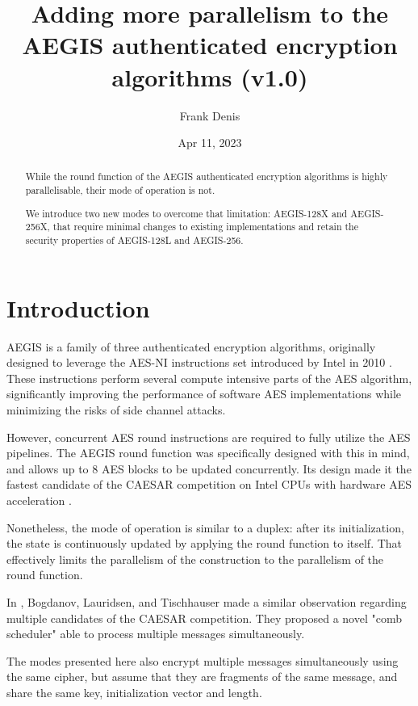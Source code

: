 \documentclass[envcountsame,runningheads,notitlepage]{llncs}
\title{Adding more parallelism to the AEGIS authenticated encryption algorithms (v1.0)}
\date{Apr 11, 2023}
\author{
  Frank Denis\inst{}
}
\institute{Fastly Inc.\\
  \href{mailto:fde@00f.net}{fde@00f.net}
}
\author{}
\institute{}
\begin{document}
\maketitle

\markboth{}{}

\begin{abstract}
  While the round function of the AEGIS authenticated encryption algorithms is highly parallelisable, their mode of operation is not.

  We introduce two new modes to overcome that limitation: AEGIS-128X and AEGIS-256X, that require minimal changes to existing implementations and retain the security properties of AEGIS-128L and AEGIS-256.
\end{abstract}

\section{Introduction}
\label{sec:introduction}

AEGIS \cite{SAC:WuPre13} is a family of three authenticated encryption algorithms, originally designed to leverage the AES-NI instructions set introduced by Intel in 2010 \cite{Akdemir2010BreakthroughAP}.
These instructions perform several compute intensive parts of the AES algorithm, significantly improving the performance of software AES implementations while minimizing the risks of side channel attacks.

However, concurrent AES round instructions are required to fully utilize the AES pipelines. The AEGIS round function was specifically designed with this in mind, and allows up to 8 AES blocks to be updated concurrently. Its design made it the fastest candidate of the CAESAR competition on Intel CPUs with hardware AES acceleration \cite{EPRINT:ARAR16}.

Nonetheless, the mode of operation is similar to a duplex: after its initialization, the state is continuously updated by applying the round function to itself.
That effectively limits the parallelism of the construction to the parallelism of the round function.

In \cite{FSE:BogLauTis15}, Bogdanov, Lauridsen, and Tischhauser made a similar observation regarding multiple candidates of the CAESAR competition. They proposed a novel "comb scheduler" able to process multiple messages simultaneously.

The modes presented here also encrypt multiple messages simultaneously using the same cipher, but assume that they are fragments of the same message, and share the same key, initialization vector and length.
\end{document}
